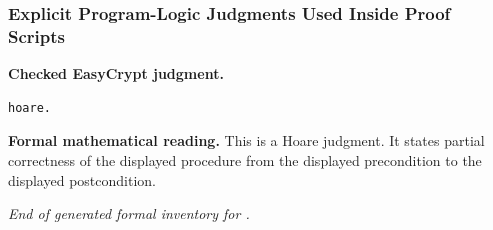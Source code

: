 \subsubsection*{Explicit Program-Logic Judgments Used Inside Proof Scripts}
\begin{formaljudgment}
\noindent\textbf{Checked EasyCrypt judgment.}
\begin{lstlisting}[language=EasyCrypt,basicstyle=\ttfamily\scriptsize]
hoare.
\end{lstlisting}
\noindent\textbf{Formal mathematical reading.} This is a Hoare judgment.  It states partial correctness of the displayed procedure from the displayed precondition to the displayed postcondition.
\end{formaljudgment}

\medskip
\noindent\emph{End of generated formal inventory for .}
